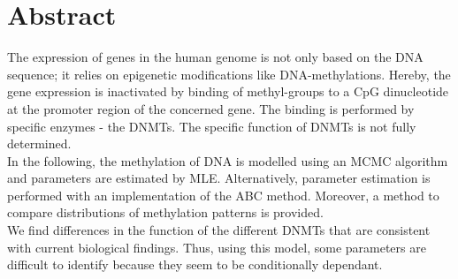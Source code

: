 \section*{Abstract}

The expression of genes in the human genome is not only based on the DNA sequence; it relies on epigenetic modifications like DNA-methylations. Hereby, the gene expression is inactivated by binding of methyl-groups to a \ac{CpG} dinucleotide at the promoter region of the concerned gene. The binding is performed by specific enzymes - the \acp{DNMT}. The specific function of \acp{DNMT} is not fully determined.\\

In the following, the methylation of DNA is modelled using an \ac{MCMC} algorithm and parameters are estimated by \ac{MLE}. Alternatively, parameter estimation is performed with an implementation of the \ac{ABC} method. Moreover, a method to compare distributions of methylation patterns is provided.\\
We find differences in the function of the different \acp{DNMT} that are consistent with current biological findings. Thus, using this model, some parameters are difficult to identify because they seem to be conditionally dependant.

\newpage
\mbox{}
\newpage